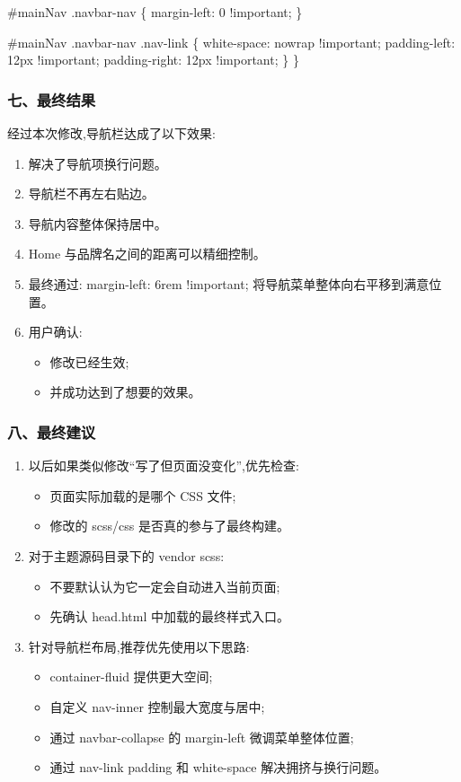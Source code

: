 \documentclass[lang=cn,scheme=chinese,color=blue,device=normal,toc=onecol,math=cm]{elegantbook}
\begin{document}
\#mainNav .navbar-nav \{ margin-left: 0 !important; \}\par


\#mainNav .navbar-nav .nav-link \{ white-space: nowrap !important; padding-left: 12px !important; padding-right: 12px !important; \} \}\par


\subsubsection{七、最终结果}


经过本次修改,导航栏达成了以下效果:\par


\begin{enumerate}
\item 解决了导航项换行问题。
\item 导航栏不再左右贴边。
\item 导航内容整体保持居中。
\item Home 与品牌名之间的距离可以精细控制。
\item 最终通过: margin-left: 6rem !important; 将导航菜单整体向右平移到满意位置。
\item 用户确认: 
\begin{itemize}
\item 修改已经生效;
\item 并成功达到了想要的效果。
\end{itemize}
\end{enumerate}


\subsubsection{八、最终建议}


\begin{enumerate}
\item 以后如果类似修改“写了但页面没变化”,优先检查: 
\begin{itemize}
\item 页面实际加载的是哪个 CSS 文件;
\item 修改的 scss/\allowbreak{}css 是否真的参与了最终构建。
\end{itemize}
\item 对于主题源码目录下的 vendor scss: 
\begin{itemize}
\item 不要默认认为它一定会自动进入当前页面;
\item 先确认 head.html 中加载的最终样式入口。
\end{itemize}
\item 针对导航栏布局,推荐优先使用以下思路: 
\begin{itemize}
\item container-fluid 提供更大空间;
\item 自定义 nav-inner 控制最大宽度与居中;
\item 通过 navbar-collapse 的 margin-left 微调菜单整体位置;
\item 通过 nav-link padding 和 white-space 解决拥挤与换行问题。
\end{itemize}
\end{enumerate}
\end{document}
